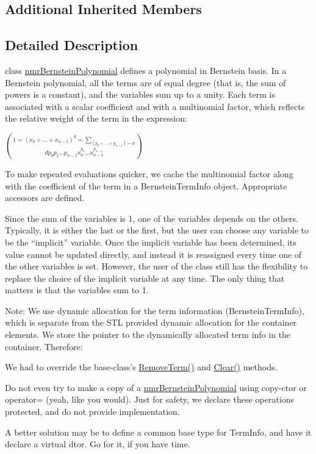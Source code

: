\subsection*{Additional Inherited Members}


\subsection{Detailed Description}
class \hyperlink{classnmr_bernstein_polynomial}{nmr\-Bernstein\-Polynomial} defines a polynomial in Bernstein basis. In a Bernstein polynomial, all the terms are of equal degree (that is, the sum of powers is a constant), and the variables sum up to a unity. Each term is associated with a scalar coefficient and with a multinomial factor, which reflects the relative weight of the term in the expression\-:

$1 = (x_0 + ... + x_{n-1}) ^ d = \sum_{(p_0 + ... + p_{n-1}) = d} \choose{d}{p_0 p_1 ... p_{n-1}} x_0^{p_0} ... x_{n-1}^{p_{n-1}}$

To make repeated evaluations quicker, we cache the multinomial factor along with the coefficient of the term in a Bernstein\-Term\-Info object. Appropriate accessors are defined.

Since the sum of the variables is 1, one of the variables depends on the others. Typically, it is either the last or the first, but the user can choose any variable to be the ``implicit'' variable. Once the implicit variable has been determined, its value cannot be updated directly, and instead it is reassigned every time one of the other variables is set. However, the user of the class still has the flexibility to replace the choice of the implicit variable at any time. The only thing that matters is that the variables sum to 1.

Note\-: We use dynamic allocation for the term information (Bernstein\-Term\-Info), which is separate from the S\-T\-L provided dynamic allocation for the container elements. We store the pointer to the dynamically allocated term info in the container. Therefore\-:


\begin{DoxyEnumerate}
\item We had to override the base-\/class's \hyperlink{classnmr_bernstein_polynomial_a615e825f6b2c453fa48bf50b387af9bb}{Remove\-Term()} and \hyperlink{classnmr_bernstein_polynomial_a7987a19a4cccb2dac54ffee7b77492fb}{Clear()} methods.
\item Do not even try to make a copy of a \hyperlink{classnmr_bernstein_polynomial}{nmr\-Bernstein\-Polynomial} using copy-\/ctor or operator= (yeah, like you would). Just for safety, we declare these operations protected, and do not provide implementation.
\item A better solution may be to define a common base type for Term\-Info, and have it declare a virtual dtor. Go for it, if you have time. 
\end{DoxyEnumerate}

